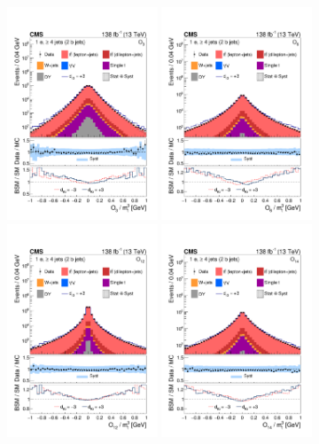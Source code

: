 \begin{figure}
    \centering
    \includegraphics[width=0.4\textwidth]{figure/Figure_001-a.pdf}
    \includegraphics[width=0.4\textwidth]{figure/Figure_001-b.pdf}
    \includegraphics[width=0.4\textwidth]{figure/Figure_001-c.pdf}
    \includegraphics[width=0.4\textwidth]{figure/Figure_001-d.pdf}

\end{figure}
